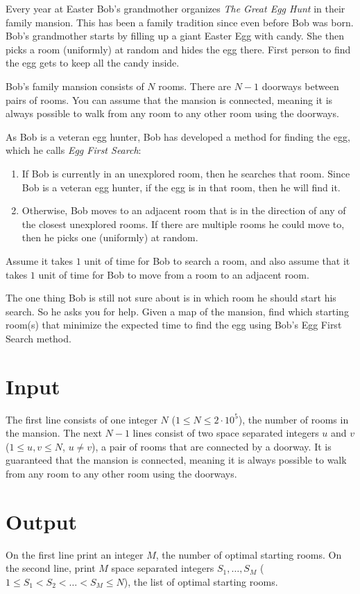 

Every year at Easter Bob's grandmother organizes \textit{The Great Egg Hunt} in their family mansion. This has been a family tradition since even before Bob was born. 
Bob's grandmother starts by filling up a giant Easter Egg with candy. She then picks a room (uniformly) at random and hides the egg there. First person to find the egg gets to keep all the candy inside.

Bob's family mansion consists of $N$ rooms. There are $N-1$ doorways between pairs of rooms. 
You can assume that the mansion is connected, meaning it is always possible to walk from any room to any other room using the doorways.

As Bob is a veteran egg hunter, Bob has developed a method for finding the egg, which he calls \textit{Egg First Search}:

\begin{enumerate}
    \item{If Bob is currently in an unexplored room, then he searches that room. 
          Since Bob is a veteran egg hunter, if the egg is in that room, then he will find it.}
      \item{Otherwise, Bob moves to an adjacent room that is in the direction of any of the closest unexplored rooms. 
          If there are multiple rooms he could move to, then he picks one (uniformly) at random.}
\end{enumerate}

Assume it takes $1$ unit of time for Bob to search a room, and also assume that it takes $1$ unit of time for Bob to move from a room to an adjacent room.

The one thing Bob is still not sure about is in which room he should start his search. So he asks you for help. Given a map of the mansion, find which starting room(s) that minimize the expected time to find the egg using Bob's Egg First Search method. 

\section*{Input}
The first line consists of one integer $N$ ($1 \leq N \leq 2 \cdot 10^5$), the number of rooms in the mansion.
The next $N-1$ lines consist of two space separated integers $u$ and $v$ ($1 \leq u,v \leq N$, $u \neq v$), a pair of rooms that are connected by a doorway.
It is guaranteed that the mansion is connected, meaning it is always possible to walk from any room to any other room using the doorways.

\section*{Output}
On the first line print an integer $M$, the number of optimal starting rooms.
On the second line, print $M$ space separated integers $S_1, \ldots, S_M$ ($1 \leq S_1 < S_2 < \ldots < S_M \leq N$), the list of optimal starting rooms.
